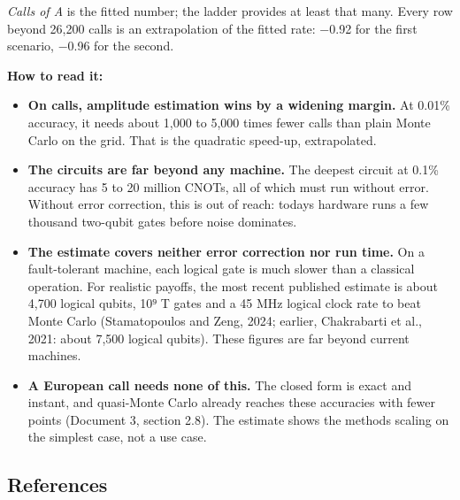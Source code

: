 \documentclass[
  10pt,
]{article}
\providecommand{\tightlist}{%
  \setlength{\itemsep}{0pt}\setlength{\parskip}{0pt}}
\begin{document}
\emph{Calls of A} is the fitted number; the ladder provides at least
that many. Every row beyond 26,200 calls is an extrapolation of the
fitted rate: −0.92 for the first scenario, −0.96 for the second.

\textbf{How to read it:}

\begin{itemize}
\tightlist
\item
  \textbf{On calls, amplitude estimation wins by a widening margin.} At
  0.01\% accuracy, it needs about 1,000 to 5,000 times fewer calls than
  plain Monte Carlo on the grid. That is the quadratic speed-up,
  extrapolated.
\item
  \textbf{The circuits are far beyond any machine.} The deepest circuit
  at 0.1\% accuracy has 5 to 20 million CNOTs, all of which must run
  without error. Without error correction, this is out of reach:
  today\textquotesingle s hardware runs a few thousand two-qubit gates
  before noise dominates.
\item
  \textbf{The estimate covers neither error correction nor run time.} On
  a fault-tolerant machine, each logical gate is much slower than a
  classical operation. For realistic payoffs, the most recent published
  estimate is about 4,700 logical qubits, 10⁹ T gates and a 45 MHz
  logical clock rate to beat Monte Carlo (Stamatopoulos and Zeng, 2024;
  earlier, Chakrabarti et al., 2021: about 7,500 logical qubits). These
  figures are far beyond current machines.
\item
  \textbf{A European call needs none of this.} The closed form is exact
  and instant, and quasi-Monte Carlo already reaches these accuracies
  with fewer points (Document 3, section 2.8). The estimate shows the
  method\textquotesingle s scaling on the simplest case, not a use case.
\end{itemize}

\hypertarget{references}{%
\subsection{References}\label{references}}
\end{document}
